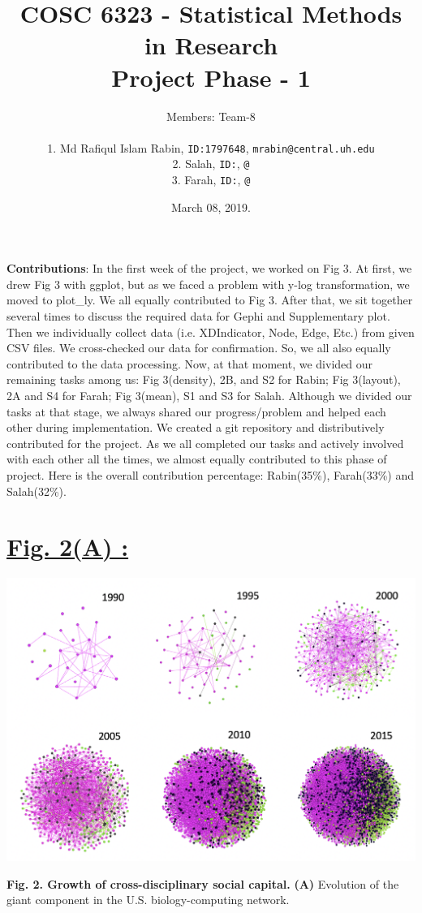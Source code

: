 \documentclass{article}\usepackage[]{graphicx}\usepackage[]{color}
\title{COSC 6323 - Statistical Methods in Research\\Project Phase - 1\\}
\author{%
    Members: Team-8 \\\\
    1. Md Rafiqul Islam Rabin, \texttt{ID:1797648}, \texttt{mrabin@central.uh.edu}\vspace{2pt} \\
    2. Salah, \texttt{ID:}, \texttt{@}\vspace{2pt} \\
    3. Farah, \texttt{ID:}, \texttt{@}\vspace{2pt} \\
}
\date{March 08, 2019.}
\begin{document}
\maketitle
\par{\textbf{Contributions}: In the first week of the project, we worked on Fig 3. At first, we drew Fig 3 with ggplot, but as we faced a problem with y-log transformation, we moved to plot\_ly. We all equally contributed to Fig 3. After that, we sit together several times to discuss the required data for Gephi and Supplementary plot. Then we individually collect data (i.e. XDIndicator, Node, Edge, Etc.) from given CSV files. We cross-checked our data for confirmation. So, we all also equally contributed to the data processing. Now, at that moment, we divided our remaining tasks among us: Fig 3(density), 2B, and S2 for Rabin; Fig 3(layout), 2A and S4 for Farah; Fig 3(mean), S1 and S3 for Salah. Although we divided our tasks at that stage, we always shared our progress/problem and helped each other during implementation. We created a git repository and distributively contributed for the project. As we all completed our tasks and actively involved with each other all the times, we almost equally contributed to this phase of project. Here is the overall contribution percentage: Rabin(35\%), Farah(33\%) and Salah(32\%).}

\newpage
\section*{\underline{Fig. 2(A) :}}
\begin{center}
\includegraphics[scale=0.6]{2A.png}
\newline
\par{\textbf{Fig. 2. Growth of cross-disciplinary social capital.} 
\textbf{(A)} Evolution of the giant component in the U.S. biology-computing network.}
\end{center}
\end{document}
